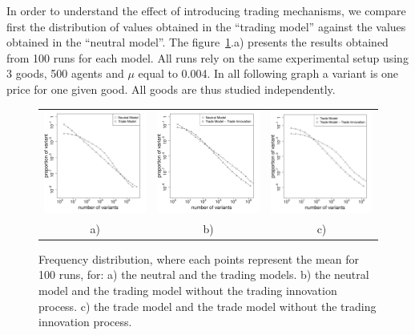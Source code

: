 \documentclass{wscpaperproc}
\begin{document}
In order to understand the effect of introducing trading mechanisms, we compare first the distribution of values obtained in the ``trading model'' against the values obtained in the ``neutral model''. The figure~\ref{fig:2setDi}.a) presents the results obtained from 100 runs for each model. All runs rely on the same experimental setup using 3 goods, 500 agents and $\mu$ equal to 0.004. In all following graph  a variant is one price for one given good. All goods are thus studied independently. 

\begin{figure}[!h]
	\begin{center}
		\begin{tabular}{ccc}
		\includegraphics[width=5.2cm]{img/2SetupDistribA.pdf} &
		\includegraphics[width=5.2cm]{img/2SetupDistribB.pdf} &
		\includegraphics[width=5.2cm]{img/2SetupDistribD.pdf} \\
		a) & b) & c)  \\
		\end{tabular}

	\end{center}
	\caption{Frequency distribution, where each points represent the mean for 100 runs, for: a) the neutral and the trading models.  b) the neutral model and the trading model without the trading innovation process. c) the trade model and the trade model without the trading innovation process.}
	\label{fig:2setDi}
\end{figure}
\end{document}
